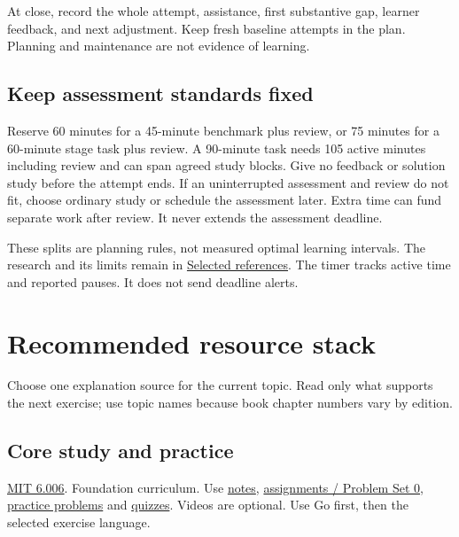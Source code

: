 \documentclass[11pt,letterpaper]{article}
\begin{document}
At close, record the whole attempt, assistance, first substantive gap, learner feedback, and next adjustment. Keep fresh baseline attempts in the plan. Planning and maintenance are not evidence of learning.

\subsection*{Keep assessment standards fixed}

Reserve 60 minutes for a 45-minute benchmark plus review, or 75 minutes for a 60-minute stage task plus review. A 90-minute task needs 105 active minutes including review and can span agreed study blocks. Give no feedback or solution study before the attempt ends. If an uninterrupted assessment and review do not fit, choose ordinary study or schedule the assessment later. Extra time can fund separate work after review. It never extends the assessment deadline.

These splits are planning rules, not measured optimal learning intervals. The research and its limits remain in \hyperref[sec:27]{Selected references}. The timer tracks active time and reported pauses. It does not send deadline alerts.

\clearpage
\section{Recommended resource stack}\label{sec:26}

Choose one explanation source for the current topic. Read only what supports the next exercise; use topic names because book chapter numbers vary by edition.

\subsection*{Core study and practice}

\href{https://ocw.mit.edu/courses/6-006-introduction-to-algorithms-spring-2020/}{MIT 6.006}. Foundation curriculum. Use \href{https://ocw.mit.edu/courses/6-006-introduction-to-algorithms-spring-2020/pages/lecture-notes/}{notes}, \href{https://ocw.mit.edu/courses/6-006-introduction-to-algorithms-spring-2020/pages/assignments/}{assignments / Problem Set 0}, \href{https://ocw.mit.edu/courses/6-006-introduction-to-algorithms-spring-2020/pages/practice-problems/}{practice problems} and \href{https://ocw.mit.edu/courses/6-006-introduction-to-algorithms-spring-2020/pages/quizzes/}{quizzes}. Videos are optional. Use Go first, then the selected exercise language.
\end{document}
